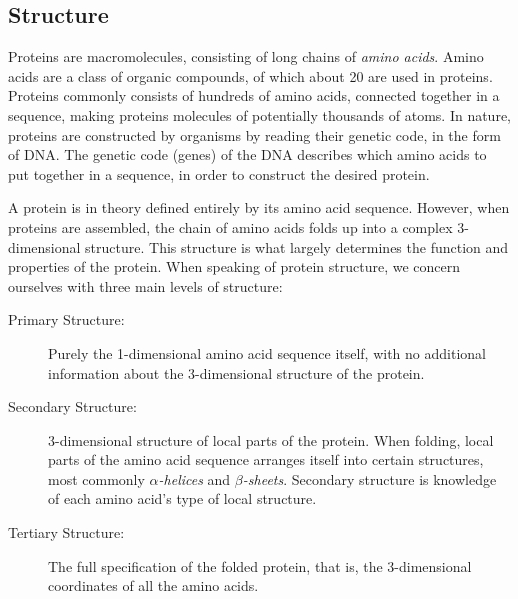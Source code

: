 

\subsection{Structure}
\label{sec:protein_structure}
Proteins are macromolecules, consisting of long chains of \textit{amino acids}. Amino acids are a class of organic compounds, of which about 20 are used in proteins. Proteins commonly consists of hundreds of amino acids, connected together in a sequence, making proteins molecules of potentially thousands of atoms. In nature, proteins are constructed by organisms by reading their genetic code, in the form of DNA. The genetic code (genes) of the DNA describes which amino acids to put together in a sequence, in order to construct the desired protein.

A protein is in theory defined entirely by its amino acid sequence. However, when proteins are assembled, the chain of amino acids folds up into a complex 3-dimensional structure. This structure is what largely determines the function and properties of the protein. When speaking of protein structure, we concern ourselves with three main levels of structure:

\begin{description}
    \item[Primary Structure:] Purely the 1-dimensional amino acid sequence itself, with no additional information about the 3-dimensional structure of the protein.
    \item[Secondary Structure:] 3-dimensional structure of local parts of the protein. When folding, local parts of the amino acid sequence arranges itself into certain structures, most commonly \textit{$\alpha$-helices} and \textit{$\beta$-sheets}. Secondary structure is knowledge of each amino acid's type of local structure.
    \item[Tertiary Structure:] The full specification of the folded protein, that is, the 3-dimensional coordinates of all the amino acids.
\end{description}

